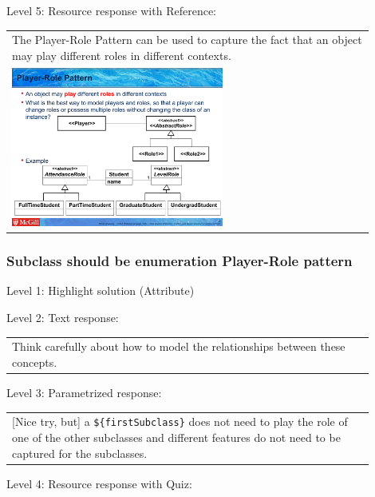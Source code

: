 \noindent Level 5: Resource response with Reference: \medskip

\begin{tabular}{|p{0.9\linewidth}}
The Player-Role Pattern can be used to capture the fact that an object may play different roles
in different contexts.

\\
\includegraphics[width=0.6\textwidth]{images/player_role.png}
\end{tabular} \medskip


\subsubsection{Subclass should be enumeration Player-Role pattern}

\noindent Level 1: Highlight solution (Attribute) \medskip

\noindent Level 2: Text response: \medskip

\begin{tabular}{|p{0.9\linewidth}}
Think carefully about how to model the relationships between these concepts.
\end{tabular} \medskip

\noindent Level 3: Parametrized response: \medskip

\begin{tabular}{|p{0.9\linewidth}}
[Nice try, but] a \verb|${firstSubclass}| does not need to play the role of one of the other subclasses and different features do not need to be captured for the subclasses.
\end{tabular} \medskip

\noindent Level 4: Resource response with Quiz: \medskip


